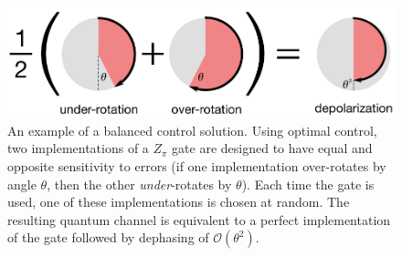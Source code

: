 \documentclass[aps,nofootinbib,pra,notitlepage,twocolumn]{revtex4-1}
\newcommand{\order}[1]{\mathcal{O}\left( #1 \right)}
\begin{document}
\begin{figure}
  \centering
  \includegraphics[width=\columnwidth]{simple_example.pdf}
  \caption{An example of a balanced control solution. Using optimal control, two implementations of a $Z_\pi$ gate are designed to have equal and opposite sensitivity to errors (if one implementation over-rotates by angle $\theta$, then the other \emph{under}-rotates by $\theta$). Each time the gate is used, one of these implementations is chosen at random. The resulting quantum channel is equivalent to a perfect implementation of the gate followed by dephasing of $\order{\theta^2}$.}
  \label{fig:simple_example}
\end{figure}
\end{document}
